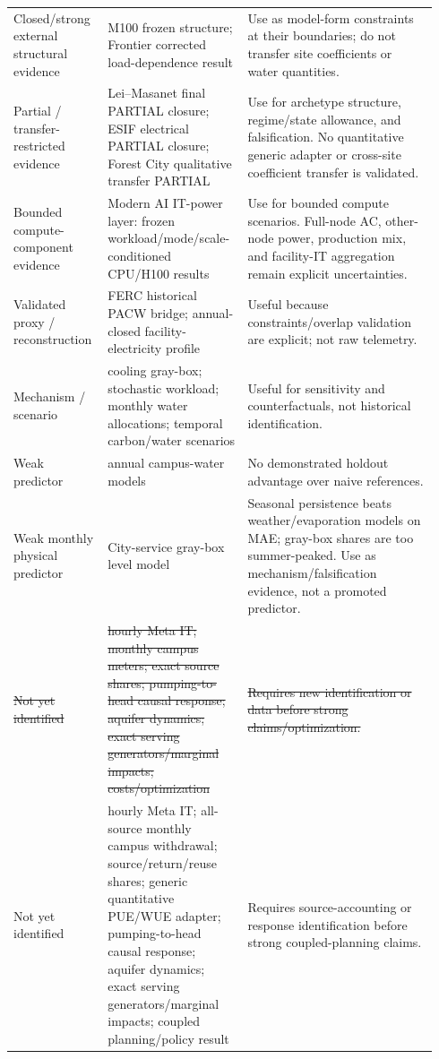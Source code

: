 \documentclass[11pt]{article}
\newcommand{\oldtxt}[1]{\textcolor{blue!70!black}{\sout{#1}}}
\newcommand{\latesttxt}[1]{\textcolor{purple!85!black}{#1}}
\begin{document}
\begin{longtable}{@{}p{0.20\linewidth}p{0.31\linewidth}p{0.43\linewidth}@{}}
\latesttxt{Closed/strong external structural evidence} & \latesttxt{M100 frozen structure; Frontier corrected load-dependence result} & \latesttxt{Use as model-form constraints at their boundaries; do not transfer site coefficients or water quantities.} \\
\latesttxt{Partial / transfer-restricted evidence} & \latesttxt{Lei--Masanet final PARTIAL closure; ESIF electrical PARTIAL closure; Forest City qualitative transfer PARTIAL} & \latesttxt{Use for archetype structure, regime/state allowance, and falsification. No quantitative generic adapter or cross-site coefficient transfer is validated.} \\
\latesttxt{Bounded compute-component evidence} & \latesttxt{Modern AI IT-power layer: frozen workload/mode/scale-conditioned CPU/H100 results} & \latesttxt{Use for bounded compute scenarios. Full-node AC, other-node power, production mix, and facility-IT aggregation remain explicit uncertainties.} \\
Validated proxy / reconstruction & FERC historical PACW bridge; annual-closed facility-electricity profile & Useful because constraints/overlap validation are explicit; not raw telemetry. \\
Mechanism / scenario & cooling gray-box; stochastic workload; monthly water allocations; temporal carbon/water scenarios & Useful for sensitivity and counterfactuals, not historical identification. \\
Weak predictor & annual campus-water models & No demonstrated holdout advantage over naive references. \\
\latesttxt{Weak monthly physical predictor} & \latesttxt{City-service gray-box level model} & \latesttxt{Seasonal persistence beats weather/evaporation models on MAE; gray-box shares are too summer-peaked. Use as mechanism/falsification evidence, not a promoted predictor.} \\
\oldtxt{Not yet identified} & \oldtxt{hourly Meta IT; monthly campus meters; exact source shares; pumping-to-head causal response; aquifer dynamics; exact serving generators/marginal impacts; costs/optimization} & \oldtxt{Requires new identification or data before strong claims/optimization.} \\
\latesttxt{Not yet identified} & \latesttxt{hourly Meta IT; all-source monthly campus withdrawal; source/return/reuse shares; generic quantitative PUE/WUE adapter; pumping-to-head causal response; aquifer dynamics; exact serving generators/marginal impacts; coupled planning/policy result} & \latesttxt{Requires source-accounting or response identification before strong coupled-planning claims.} \\
\bottomrule
\end{longtable}
\endgroup
\end{document}
